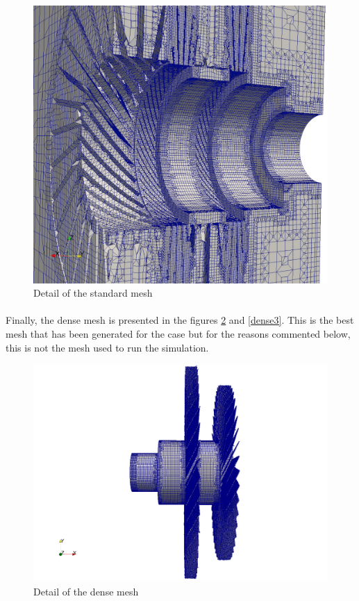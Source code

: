 \begin{figure}[h!]
\includegraphics[scale=0.35]{./mesh/newmesh/std2ok}
\centering
\caption{Detail of the standard mesh}
\label{standard2}
\end{figure}

\newpage{}

\paragraph{}Finally, the dense mesh is presented in the figures \ref{dense2} and \ref{dense3}. This is the best mesh that has been generated for the case but for the reasons commented below, this is not the mesh used to run the simulation.

\begin{figure}[h!]
\includegraphics[scale=0.24]{./mesh/newmesh/dense1}
\centering
\caption{Detail of the dense mesh}
\label{dense2}
\end{figure}

